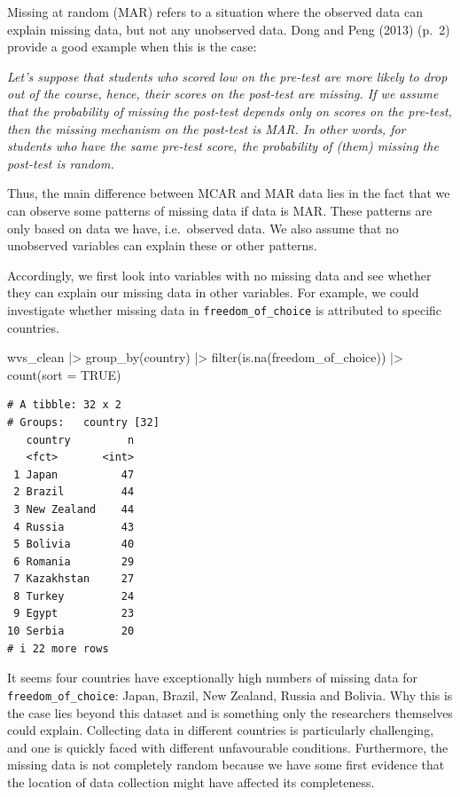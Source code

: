 \documentclass[
  letterpaper,
]{krantz}
\makeatletter
\newenvironment{Shaded}{\begin{snugshade}}{\end{snugshade}}
\newcommand{\AttributeTok}[1]{\textcolor[rgb]{0.40,0.45,0.13}{#1}}
\newcommand{\ConstantTok}[1]{\textcolor[rgb]{0.56,0.35,0.01}{#1}}
\newcommand{\FunctionTok}[1]{\textcolor[rgb]{0.28,0.35,0.67}{#1}}
\newcommand{\NormalTok}[1]{\textcolor[rgb]{0.00,0.23,0.31}{#1}}
\newcommand{\SpecialCharTok}[1]{\textcolor[rgb]{0.37,0.37,0.37}{#1}}
\renewenvironment{quote}{\begin{VF}}{\end{VF}}
\newenvironment{kframe}{%
\medskip{}
\setlength{\fboxsep}{.8em}
 \def\at@end@of@kframe{}%
 \ifinner\ifhmode%
  \def\at@end@of@kframe{\end{minipage}}%
  \begin{minipage}{\columnwidth}%
 \fi\fi%
 \def\FrameCommand##1{\hskip\@totalleftmargin \hskip-\fboxsep
 \colorbox{shadecolor}{##1}\hskip-\fboxsep
     \hskip-\linewidth \hskip-\@totalleftmargin \hskip\columnwidth}%
 \MakeFramed {\advance\hsize-\width
   \@totalleftmargin\z@ \linewidth\hsize
   \@setminipage}}%
 {\par\unskip\endMakeFramed%
 \at@end@of@kframe}
\renewenvironment{Shaded}{\begin{kframe}}{\end{kframe}}
\makeatother
\begin{document}
Missing at random (MAR) refers to a situation where the observed data
can explain missing data, but not any unobserved data. Dong and Peng
(2013) (p.~2) provide a good example when this is the case:

\begin{quote}
\emph{Let's suppose that students who scored low on the pre-test are
more likely to drop out of the course, hence, their scores on the
post-test are missing. If we assume that the probability of missing the
post-test depends only on scores on the pre-test, then the missing
mechanism on the post-test is MAR. In other words, for students who have
the same pre-test score, the probability of (them) missing the post-test
is random.}
\end{quote}

Thus, the main difference between MCAR and MAR data lies in the fact
that we can observe some patterns of missing data if data is MAR. These
patterns are only based on data we have, i.e.~observed data. We also
assume that no unobserved variables can explain these or other patterns.

Accordingly, we first look into variables with no missing data and see
whether they can explain our missing data in other variables. For
example, we could investigate whether missing data in
\texttt{freedom\_of\_choice} is attributed to specific countries.

\begin{Shaded}
\begin{Highlighting}[]
\NormalTok{wvs\_clean }\SpecialCharTok{|\textgreater{}}
  \FunctionTok{group\_by}\NormalTok{(country) }\SpecialCharTok{|\textgreater{}}
  \FunctionTok{filter}\NormalTok{(}\FunctionTok{is.na}\NormalTok{(freedom\_of\_choice)) }\SpecialCharTok{|\textgreater{}}
  \FunctionTok{count}\NormalTok{(}\AttributeTok{sort =} \ConstantTok{TRUE}\NormalTok{)}
\end{Highlighting}
\end{Shaded}

\begin{verbatim}
# A tibble: 32 x 2
# Groups:   country [32]
   country         n
   <fct>       <int>
 1 Japan          47
 2 Brazil         44
 3 New Zealand    44
 4 Russia         43
 5 Bolivia        40
 6 Romania        29
 7 Kazakhstan     27
 8 Turkey         24
 9 Egypt          23
10 Serbia         20
# i 22 more rows
\end{verbatim}

It seems four countries have exceptionally high numbers of missing data
for \texttt{freedom\_of\_choice}: Japan, Brazil, New Zealand, Russia and
Bolivia. Why this is the case lies beyond this dataset and is something
only the researchers themselves could explain. Collecting data in
different countries is particularly challenging, and one is quickly
faced with different unfavourable conditions. Furthermore, the missing
data is not completely random because we have some first evidence that
the location of data collection might have affected its completeness.
\end{document}
